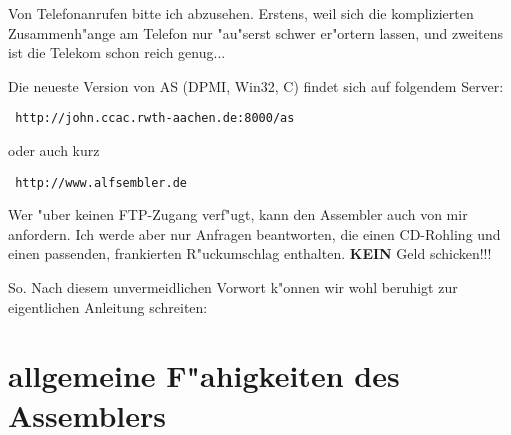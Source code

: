 \documentclass[12pt,a4paper,twoside]{report}
\newcommand{\bb}[1]{{\bf #1}}
\begin{document}
\par
Von Telefonanrufen bitte ich abzusehen.  Erstens, weil sich die
komplizierten Zusammenh"ange am Telefon nur "au"serst schwer er"ortern
lassen, und zweitens ist die Telekom schon reich genug...
\par
Die neueste Version von AS (DPMI, Win32, C) findet sich auf folgendem
Server:
\begin{verbatim}
 http://john.ccac.rwth-aachen.de:8000/as
\end{verbatim}
oder auch kurz
\begin{verbatim}
 http://www.alfsembler.de
\end{verbatim}
\par
Wer "uber keinen FTP-Zugang verf"ugt, kann den Assembler auch von mir
anfordern.  Ich werde aber nur Anfragen beantworten, die einen CD-Rohling
und einen passenden, frankierten R"uckumschlag enthalten.  \bb{KEIN} Geld
schicken!!!
\par
So. Nach diesem unvermeidlichen Vorwort k"onnen wir wohl beruhigt
zur eigentlichen Anleitung schreiten:


\section{allgemeine F"ahigkeiten des Assemblers}
\end{document}
